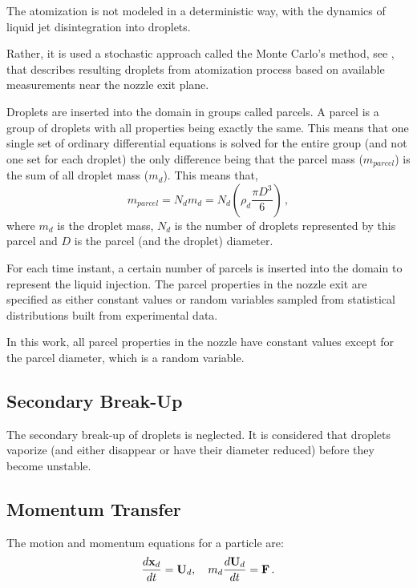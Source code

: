 The atomization is not modeled in a deterministic way, with the dynamics of liquid jet disintegration into droplets. 

Rather, it is used a stochastic approach called the Monte Carlo's method, see \cite{baumgarten2006mixture}, that describes resulting droplets from atomization process based on available measurements near the nozzle exit plane.

Droplets are inserted into the domain in groups called parcels. A parcel is
a group of droplets with all properties being exactly the same.
This means that one single set of ordinary differential equations is solved for
the entire group (and
not one set for each droplet) the only difference being that the parcel mass ($m_{parcel}$) is
the sum of all droplet mass ($m_d$). This means that,
\begin{equation}
 m_{parcel} = N_d m_d = N_d\left( \rho_d \frac{\pi D^3}{6}\right) \, ,
\end{equation}
where $m_d$ is the droplet mass, $N_d$ is the number of droplets represented by this parcel and $D$ is the parcel (and the droplet) diameter.


For each time instant, a certain number of parcels is inserted into the domain to represent the
liquid injection. The parcel properties in the nozzle exit are specified as either constant values or random variables sampled from statistical distributions built from experimental data.

In this work, all parcel properties in the nozzle have constant values except for the parcel diameter,
which is a random variable.


\subsection{Secondary Break-Up}

The secondary break-up of droplets is neglected. It is considered that droplets
vaporize (and either disappear or have their diameter reduced) before they
become unstable.

\subsection{Momentum Transfer}

The motion and momentum equations for a particle are:
\begin{equation}\label{eq: drop_mom}
\frac{d\bv{x}_d}{dt} =\bv{U}_d  , \quad m_d \frac{d\bv{U}_d}{dt} = \bv{F} \, .
\end{equation}


